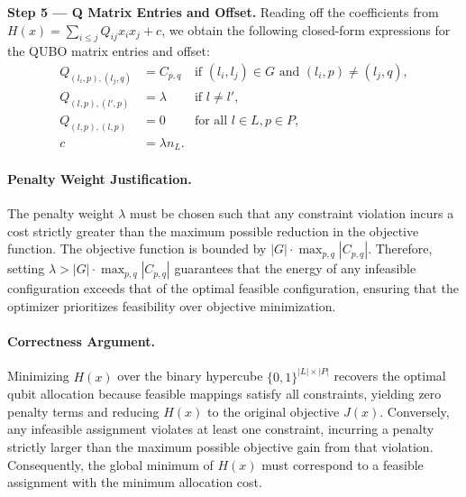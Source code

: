 \documentclass[12pt]{article}
\begin{document}
\textbf{Step 5 --- Q Matrix Entries and Offset.}
Reading off the coefficients from $H(x) = \sum_{i \le j} Q_{ij} x_i x_j + c$, we obtain the following closed-form expressions for the QUBO matrix entries and offset:
\begin{align}
Q_{(l_i,p), (l_j,q)} &= C_{p,q} & \text{if } (l_i, l_j) \in G \text{ and } (l_i,p) \neq (l_j,q), \\
Q_{(l,p), (l',p)} &= \lambda & \text{if } l \neq l', \\
Q_{(l,p), (l,p)} &= 0 & \text{for all } l \in L, p \in P, \\
c &= \lambda n_L.
\end{align}

\paragraph{Penalty Weight Justification.}
The penalty weight $\lambda$ must be chosen such that any constraint violation incurs a cost strictly greater than the maximum possible reduction in the objective function. The objective function is bounded by $|G| \cdot \max_{p,q} |C_{p,q}|$. Therefore, setting $\lambda > |G| \cdot \max_{p,q} |C_{p,q}|$ guarantees that the energy of any infeasible configuration exceeds that of the optimal feasible configuration, ensuring that the optimizer prioritizes feasibility over objective minimization.

\paragraph{Correctness Argument.}
Minimizing $H(x)$ over the binary hypercube $\{0,1\}^{|L| \times |P|}$ recovers the optimal qubit allocation because feasible mappings satisfy all constraints, yielding zero penalty terms and reducing $H(x)$ to the original objective $J(x)$. Conversely, any infeasible assignment violates at least one constraint, incurring a penalty strictly larger than the maximum possible objective gain from that violation. Consequently, the global minimum of $H(x)$ must correspond to a feasible assignment with the minimum allocation cost.
\end{document}
